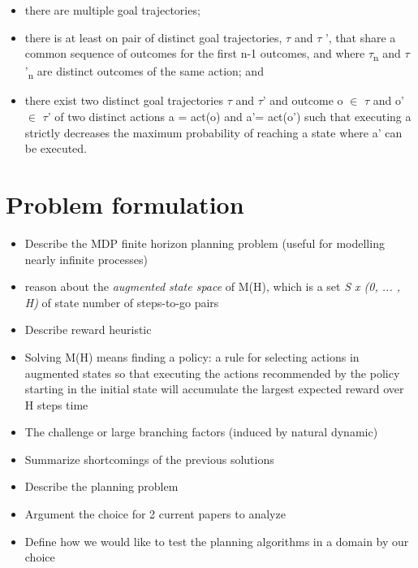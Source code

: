 \documentclass[runningheads,a4paper]{llncs}
\begin{document}

\begin{itemize}
	\item there are multiple goal trajectories;
	\item there is at least on pair of distinct goal trajectories, $\tau$ and $\tau$ ', that share a common sequence of outcomes for the first n-1 outcomes, and where $\tau$\textsubscript{n} and $\tau$'\textsubscript{n} are distinct outcomes of the same action; and
	\item there exist two distinct goal trajectories $\tau$ and $\tau$' and outcome o $\in$ $\tau$ and o' $\in$ $\tau$' of two distinct actions a = act(o) and a'= act(o') such that executing a strictly decreases the maximum probability of reaching a state where a' can be executed.
\end{itemize}


\section{Problem formulation}
\begin{itemize}
	\item Describe the MDP finite horizon planning problem (useful for modelling nearly infinite processes)
	\item reason about the \emph{augmented state space} of M(H), which is a set \emph{S x (0, ... , H)} of state number of steps-to-go pairs
	\item Describe reward heuristic
	\item Solving M(H) means finding a policy: a rule for selecting actions in augmented states so that executing the actions recommended by the policy starting in the initial state will accumulate the largest expected reward over H steps time
	\item The challenge or large branching factors (induced by natural dynamic)
	\item Summarize shortcomings of the previous solutions
	\item Describe the planning problem
	\item Argument the choice for 2 current papers to analyze
	\item Define how we would like to test the planning algorithms in a domain by our choice
\end{itemize}
\end{document}
